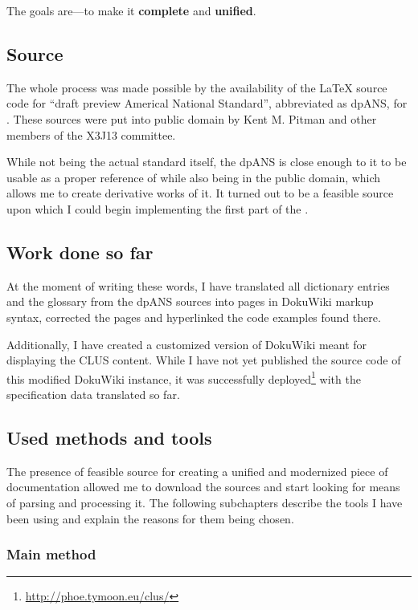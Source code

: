 The goals are---to make it \textbf{complete} and \textbf{unified}.

\subsection{Source}

The whole process was made possible by the availability of the \LaTeX{} source code for ``draft preview Americal National Standard'', abbreviated as dpANS, for \cl{}. These sources were put into public domain by Kent M. Pitman and other members of the X3J13 committee.

While not being the actual standard itself, the dpANS is close enough to it to be usable as a proper reference of \cl{} while also being in the public domain, which allows me to create derivative works of it. It turned out to be a feasible source upon which I could begin implementing the first part of the \us{}.

\subsection{Work done so far}

At the moment of writing these words, I have translated all dictionary entries and the glossary from the dpANS sour\-ces into pages in Doku\-Wiki markup syntax, corrected the pages and hyperlinked the code examples found there.

Additionally, I have created a customized version of Doku\-Wiki meant for displaying the CLUS content. While I have not yet published the source code of this modified Doku\-Wiki instance, it was successfully deployed\footnote{\url{http://phoe.tymoon.eu/clus/}} with the specification data translated so far.

\subsection{Used methods and tools}

The presence of feasible source for creating a unified and modernized piece of \cl{} documentation allowed me to download the sources and start looking for means of parsing and processing it. The following subchapters describe the tools I have been using and explain the reasons for them being chosen.

\subsubsection{Main method}

